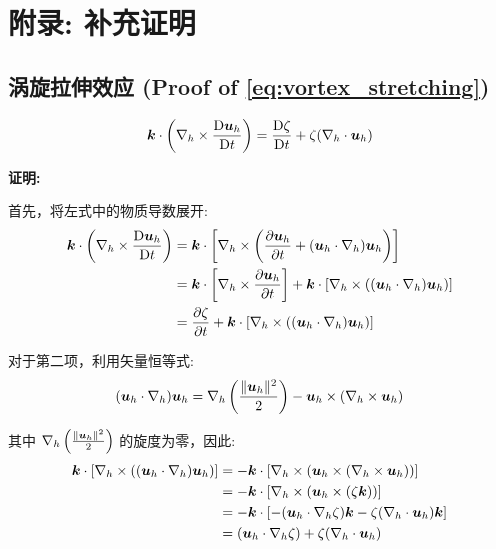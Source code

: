 \section*{附录: 补充证明}

\subsection*{涡旋拉伸效应 (Proof of \eqref{eq:vortex_stretching})}

\begin{equation}
    \bm{k} \cdot \left(\nabla_h \times \frac{\mathrm{D} \bm{u}_h}{\mathrm{D} t}\right) = \frac{\mathrm{D} \zeta}{\mathrm{D} t} + \zeta (\nabla_h \cdot \bm{u}_h)
    \label{eq:vortex_stretching_proof}
\end{equation}

\vspace{1em}
\textbf{证明:}

首先，将左式中的物质导数展开:
\begin{align*}
    \kvec \cdot \left(\nabla_h \times \matderiv{\vel_h}\right)
    &= \kvec \cdot \left[\nabla_h \times \left(\pde{\vel_h}{\timevar} + (\vel_h \cdot \nabla_h)\vel_h\right)\right] \\
    &= \kvec \cdot \left[\nabla_h \times \pde{\vel_h}{\timevar}\right] + \kvec \cdot \left[\nabla_h \times \left((\vel_h \cdot \nabla_h)\vel_h\right)\right] \\
    &= \pde{\relvort}{\timevar} + \kvec \cdot \left[\nabla_h \times \left((\vel_h \cdot \nabla_h)\vel_h\right)\right]
\end{align*}

对于第二项，利用矢量恒等式:
\begin{align*}
(\bm{u}_h \cdot \nabla_h)\bm{u}_h = \nabla_h \left(\frac{\lVert \bm{u}_h \rVert^2}{2}\right) - \bm{u}_h \times (\nabla_h \times \bm{u}_h)
\end{align*}

其中 $\nabla_h \left(\frac{\lVert \bm{u}_h \rVert^2}{2}\right)$ 的旋度为零，因此:
\begin{align*}
    \bm{k} \cdot \left[\nabla_h \times \left((\bm{u}_h \cdot \nabla_h)\bm{u}_h\right)\right]
    &= -\bm{k} \cdot \left[\nabla_h \times \left(\bm{u}_h \times (\nabla_h \times \bm{u}_h)\right)\right] \\
    &= -\bm{k} \cdot \left[\nabla_h \times (\bm{u}_h \times (\zeta \bm{k}))\right] \\
    &= -\bm{k} \cdot \left[-(\bm{u}_h \cdot \nabla_h \zeta) \bm{k} - \zeta(\nabla_h \cdot \bm{u}_h) \bm{k}\right] \\
    &= (\bm{u}_h \cdot \nabla_h \zeta) + \zeta(\nabla_h \cdot \bm{u}_h)
\end{align*}

